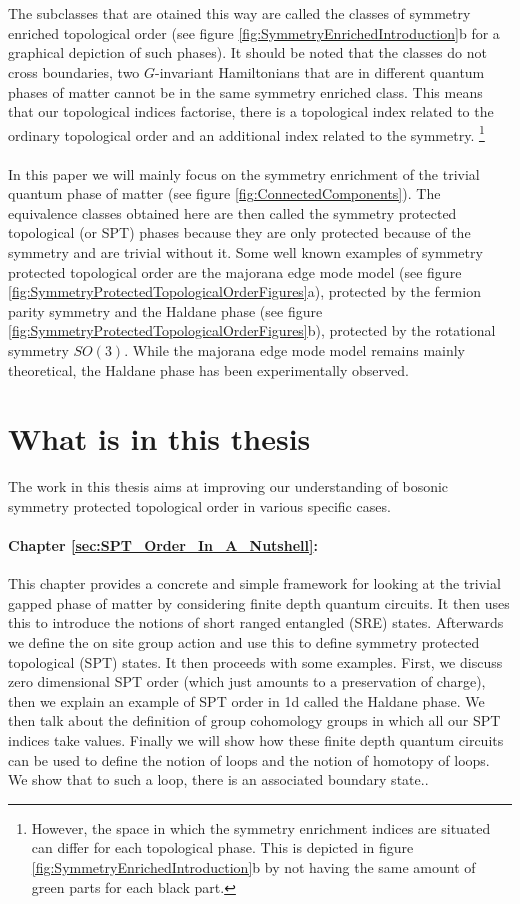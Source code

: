 \\\\
The subclasses that are otained this way are called the classes of symmetry enriched topological order (see figure \ref{fig:SymmetryEnrichedIntroduction}b for a graphical depiction of such phases). It should be noted that the classes do not cross boundaries, two $G$-invariant Hamiltonians that are in different quantum phases of matter cannot be in the same symmetry enriched class. This means that our topological indices factorise, there is a topological index related to the ordinary topological order and an additional index related to the symmetry. \footnote{However, the space in which the symmetry enrichment indices are situated can differ for each topological phase. This is depicted in figure \ref{fig:SymmetryEnrichedIntroduction}b by not having the same amount of green parts for each black part.}
\\\\
In this paper we will mainly focus on the symmetry enrichment of the trivial quantum phase of matter (see figure \ref{fig:ConnectedComponents}). The equivalence classes obtained here are then called the symmetry protected topological (or SPT) phases because they are only protected because of the symmetry and are trivial without it. Some well known examples of symmetry protected topological order are the majorana edge mode model (see figure \ref{fig:SymmetryProtectedTopologicalOrderFigures}a), protected by the fermion parity symmetry and the Haldane phase (see figure \ref{fig:SymmetryProtectedTopologicalOrderFigures}b), protected by the rotational symmetry $SO(3)$. While the majorana edge mode model remains mainly theoretical, the Haldane phase has been experimentally\cite{sompet2022realizing} observed.

\section{What is in this thesis}
The work in this thesis aims at improving our understanding of bosonic symmetry protected topological order in various specific cases.
\paragraph{Chapter \ref{sec:SPT_Order_In_A_Nutshell}:}This chapter provides a concrete and simple framework for looking at the trivial gapped phase of matter by considering finite depth quantum circuits. It then uses this to introduce the notions of short ranged entangled (SRE) states. Afterwards we define the on site group action and use this to define symmetry protected topological (SPT) states. It then proceeds with some examples. First, we discuss zero dimensional SPT order (which just amounts to a preservation of charge), then we explain an example of SPT order in 1d called the Haldane phase. We then talk about the definition of group cohomology groups in which all our SPT indices take values. Finally we will show how these finite depth quantum circuits can be used to define the notion of loops and the notion of homotopy of loops. We show that to such a loop, there is an associated boundary state..
